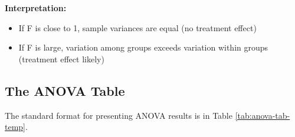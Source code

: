 \documentclass[
]{book}
\providecommand{\tightlist}{%
  \setlength{\itemsep}{0pt}\setlength{\parskip}{0pt}}
\begin{document}
\textbf{Interpretation:}

\begin{itemize}
\tightlist
\item
  If F is close to 1, sample variances are equal (no treatment effect)
\item
  If F is large, variation among groups exceeds variation within groups (treatment effect likely)
\end{itemize}

\subsection{The ANOVA Table}\label{the-anova-table}

The standard format for presenting ANOVA results is in Table \ref{tab:anova-tab-temp}.
\end{document}
